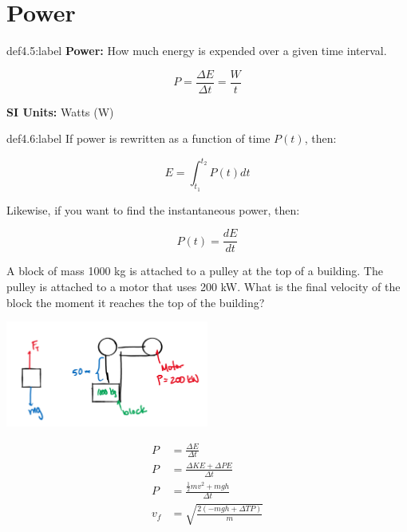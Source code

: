 \section{Power}

\begin{definition}[Power]{def4.5:label}
    \textbf{Power:} How much energy is expended over a given time interval.

    $$
    P = \frac{\Delta E}{\Delta t} = \frac{W}{t}
    $$

    \textbf{SI Units:} Watts (W)
\end{definition}


\begin{definition}{def4.6:label}
    If power is rewritten as a function of time $P(t)$, then:

    $$
    E = \int_{t_1}^{t_2} P(t)dt 
    $$

    Likewise, if you want to find the instantaneous power, then:

    $$
    P(t) = \frac{dE}{dt}
    $$
\end{definition}


\begin{problem}
    A block of mass 1000 kg is attached to a pulley at the top of a building. The pulley is attached to a motor that uses 200 kW. What is the final velocity of the block the moment it reaches the top of the building?

    \begin{center}
        \includegraphics[width=0.5\textwidth]{chapters/ch4/images/fig4_8}
    \end{center}

    $$
    \begin{aligned}
        P &= \frac{\Delta E}{\Delta t}\\
        P &= \frac{\Delta KE + \Delta PE}{\Delta t}\\
        P &= \frac{\frac{1}{2}mv^2+mgh}{\Delta t}\\
        v_f &= \sqrt{\frac{2(-mgh+\Delta T P)}{m}}
    \end{aligned}
    $$
\end{problem}


